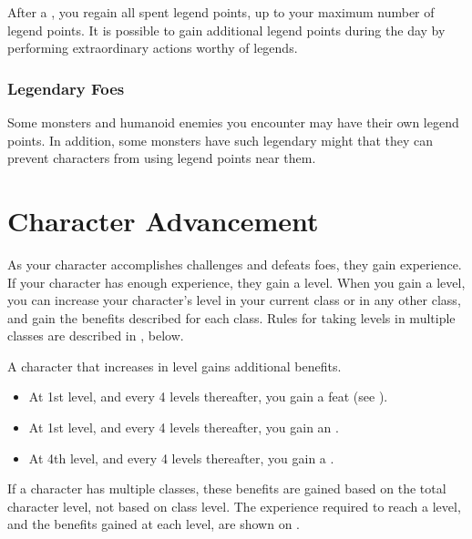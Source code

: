             After a , you regain all spent legend points, up to your maximum number of legend points.
            It is possible to gain additional legend points during the day by performing extraordinary actions worthy of legends.

        \subsubsection{Legendary Foes}
            Some monsters and humanoid enemies you encounter may have their own legend points.
            In addition, some monsters have such legendary might that they can prevent characters from using legend points near them.

\section{Character Advancement}\label{Character Advancement}

    As your character accomplishes challenges and defeats foes, they gain experience.
    If your character has enough experience, they gain a level.
    When you gain a level, you can increase your character's level in your current class or in any other class, and gain the benefits described for each class.
    Rules for taking levels in multiple classes are described in , below.

    A character that increases in level gains additional benefits.
    \begin{itemize}
        \item At 1st level, and every 4 levels thereafter, you gain a feat (see ).
        \item At 1st level, and every 4 levels thereafter, you gain an .
        \item At 4th level, and every 4 levels thereafter, you gain a .
    \end{itemize}

    If a character has multiple classes, these benefits are gained based on the total character level, not based on class level.
    The experience required to reach a level, and the benefits gained at each level, are shown on .

